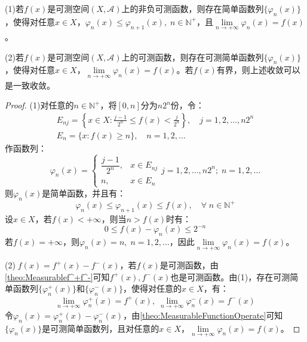\begin{theorem}\label{theo:MeasurableFunctionSimpleFunction}
	(1)若$f(x)$是可测空间$(X,\mathscr{A})$上的非负可测函数，则存在简单函数列$\{\varphi_n(x)\}$，使得对任意$x\in X$，$\varphi_n(x)\leqslant\varphi_{n+1}(x),\;n\in\mathbb{N}^+$，且$\lim\limits_{n\to+\infty}\varphi_n(x)=f(x)$。\par
	(2)若$f(x)$是可测空间$(X,\mathscr{A})$上的可测函数，则存在可测简单函数列$\{\varphi_n(x)\}$，使得对任意$x\in X$，$\lim\limits_{n\to+\infty}\varphi_n(x)=f(x)$。若$f(x)$有界，则上述收敛可以是一致收敛。
\end{theorem}
\begin{proof}
	(1)对任意的$n\in\mathbb{N}^+$，将$[0,n]$分为$n2^n$份，令：
	\begin{gather*}
		E_{nj}=\left\{x\in X:\frac{j-1}{2^n}\leqslant f(x)<\frac{j}{2^n}\right\},\quad j=1,2,\dots,n2^n \\
		E_n=\{x:f(x)\geqslant n\},\quad n=1,2,\dots
	\end{gather*}
	作函数列：
	\begin{equation*}
		\varphi_n(x)=
		\begin{cases}
			\dfrac{j-1}{2^n},&x\in E_{nj} \\
			n,&x\in E_n
		\end{cases}
		j=1,2,\dots,n2^n;\;n=1,2,\dots
	\end{equation*}
	则$\varphi_n(x)$是简单函数，并且有：
	\begin{equation*}
		\varphi_n(x)\leqslant\varphi_{n+1}(x)\leqslant f(x),\quad\forall\;n\in\mathbb{N}^+
	\end{equation*}
	设$x\in X$，若$f(x)<+\infty$，则当$n>f(x)$时有：
	\begin{equation*}
		0\leqslant f(x)-\varphi_n(x)\leqslant 2^{-n}
	\end{equation*}
	若$f(x)=+\infty$，则$\varphi_n(x)=n,\;n=1,2,\dots$，因此$\lim\limits_{n\to+\infty}\varphi_n(x)=f(x)$。\par
	(2)$\;f(x)=f^+(x)-f^-(x)$，若$f(x)$是可测函数，由\cref{theo:Measurablef^+f^-}可知$f^+(x),f^-(x)$也是可测函数。由(1)，存在可测简单函数列$\{\varphi_n^+(x)\}$和$\{\varphi_n^-(x)\}$，使得对任意的$x\in X$，有：
	\begin{equation*}
		\lim\limits_{n\to+\infty}\varphi_n^+(x)=f^+(x),\;
		\lim\limits_{n\to+\infty}\varphi_n^-(x)=f^-(x)
	\end{equation*}
	令$\varphi_n(x)=\varphi_n^+(x)-\varphi_n^-(x)$，由\cref{theo:MeasurableFunctionOperate}可知$\{\varphi_n(x)\}$是可测简单函数列，且对任意的$x\in X$，$\lim\limits_{n\to+\infty}\varphi_n(x)=f(x)$。\par

\end{proof}
